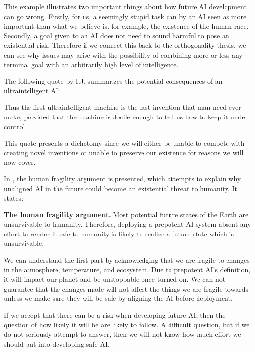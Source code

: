 \documentclass[12pt,A4]{report}
\theoremstyle{definition}
\begin{document}
This example illustrates two important things about how future AI development can go wrong. Firstly, for us, a seemingly stupid task can by an AI seen as more important than what we believe is, for example, the existence of the human race. Secondly, a goal given to an AI does not need to sound harmful to pose an existential risk. Therefore if we connect this back to the orthogonality thesis, we can see why issues may arise with the possibility of combining more or less any terminal goal with an arbitrarily high level of intelligence. 

The following quote by I.J. \citet[p.33]{IJGood} summarizes the potential consequences of an ultraintelligent AI: 
\begin{displayquote}
Thus the first ultraintelligent machine is the last invention that man need ever make, provided that the machine is docile enough to tell us how to keep it under control.
\end{displayquote}
This quote presents a dichotomy since we will either be unable to compete with creating novel inventions or unable to preserve our existence for reasons we will now cover.

In \citet[p.19]{CritchKruger}, the human fragility argument is presented, which attempts to explain why unaligned AI in the future could become an existential threat to humanity. It states:
\begin{displayquote}
\textbf{The human fragility argument.} 
Most potential future states of the Earth are unsurvivable to humanity. Therefore, deploying a prepotent AI system absent any effort to render it safe to humanity is likely to realize a future state which is unsurvivable.
\end{displayquote}
We can understand the first part by acknowledging that we are fragile to changes in the atmosphere, temperature, and ecosystem. Due to prepotent AI's definition, it will impact our planet and be unstoppable once turned on. We can not guarantee that the changes made will not affect the things we are fragile towards unless we make sure they will be safe by aligning the AI before deployment. 

If we accept that there can be a risk when developing future AI, then the question of how likely it will be are likely to follow. A difficult question, but if we do not seriously attempt to answer, then we will not know how much effort we should put into developing safe AI. 
\end{document}
